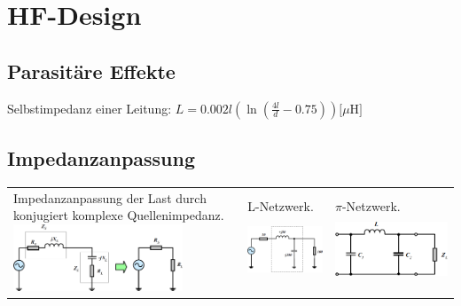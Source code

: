 \section{HF-Design}
\subsection{Parasitäre Effekte }
Selbstimpedanz einer Leitung: $ L=0.002 l \left(\ln\left(\frac {4l}d-0.75
\right) \right) \text{[$\mu$H]}$

\subsection{Impedanzanpassung }
\begin{tabular}{lll}
\parbox{10cm}{
	Impedanzanpassung der Last durch konjugiert komplexe Quellenimpedanz.\\
	\includegraphics[height=2cm]{./bilder/rfdesign_matching.png}
    }
& \parbox{3cm}{
    L-Netzwerk.\\
    \includegraphics[height=2cm]{./bilder/rfdesign_matching_L_network.png}
    }
& \parbox{3cm}{
    $\pi$-Netzwerk.\\
    \includegraphics[height=2cm]{./bilder/rfdesign_matching_pi_network.png}
    }
\end{tabular}\\

